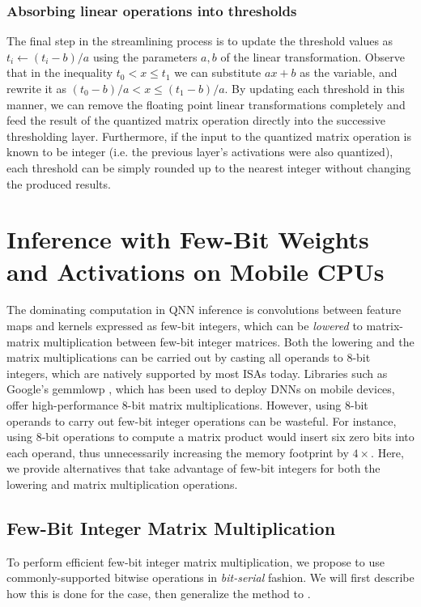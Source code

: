 \documentclass[sigconf]{acmart}
\begin{document}
\subsubsection{Absorbing linear operations into thresholds}
The final step in the streamlining process is to update the threshold values as $t_i \gets (t_i - b) / a$ using the parameters $a, b$ of the linear transformation.
Observe that in the inequality $t_0 < x \leq t_1$ we can substitute $ax+b$ as the variable, and rewrite it as $(t_0 - b) / a < x \leq (t_1 - b) / a$.
By updating each threshold in this manner, we can remove the floating point linear transformations completely and feed the result of the quantized matrix operation directly into the successive thresholding layer.
Furthermore, if the input to the quantized matrix operation is known to be integer (i.e. the previous layer's activations were also quantized), each threshold can be simply rounded up to the nearest integer without changing the produced results.

\section{Inference with Few-Bit Weights and Activations on Mobile CPUs}
The dominating computation in QNN inference is convolutions between feature maps and kernels expressed as few-bit integers, which can be \emph{lowered} \cite{convlowering} to matrix-matrix multiplication between few-bit integer matrices.
Both the lowering and the matrix multiplications can be carried out by casting all operands to 8-bit integers, which are natively supported by most ISAs today.
Libraries such as Google's gemmlowp \cite{gemmlowp}, which has been used to deploy DNNs on mobile devices, offer high-performance 8-bit matrix multiplications.
However, using 8-bit operands to carry out few-bit integer operations can be wasteful.
For instance, using 8-bit operations to compute a  matrix product would insert six zero bits into each operand, thus unnecessarily increasing the memory footprint by $4\times$.
Here, we provide alternatives that take advantage of few-bit integers for both the lowering and matrix multiplication operations.

\subsection{Few-Bit Integer Matrix Multiplication}
\label{sec:fewbitgemm}
To perform efficient few-bit integer matrix multiplication, we propose to use commonly-supported bitwise operations in \emph{bit-serial} fashion.
We will first describe how this is done for the  case, then generalize the method to .
\end{document}
